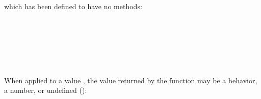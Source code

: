 \begin{AgdaAlign}
which has been defined to have no methods:
%
\begin{code}%
%
\>[6]\AgdaSpace{}%
\AgdaSymbol{:}\AgdaSpace{}%
\AgdaSpace{}%
\AgdaSpace{}%
\AgdaSpace{}%
\AgdaSpace{}%
\AgdaSpace{}%
\AgdaSpace{}%
\<%
\\
%
\>[6]\AgdaSpace{}%
\AgdaSymbol{(}\AgdaSpace{}%
\AgdaSpace{}%
\AgdaSymbol{)}\AgdaSpace{}%
\AgdaSpace{}%
\AgdaSymbol{=}\<%
\\
\>[6][@{}l@{\AgdaIndent{0}}]%
\>[8]\AgdaSpace{}%
\AgdaSpace{}%
\AgdaSpace{}%
%
\>[20]\AgdaOperator{\AgdaFunction{[}}%
\>[23]\AgdaSymbol{(}\AgdaSpace{}%
\AgdaSpace{}%
\AgdaSpace{}%
\AgdaSpace{}%
\AgdaSpace{}%
\AgdaSymbol{(}\AgdaSpace{}%
\AgdaSpace{}%
\AgdaSpace{}%
\AgdaSpace{}%
\AgdaSymbol{(}\AgdaSpace{}%
\AgdaSpace{}%
\AgdaSymbol{))}\AgdaSpace{}%
\AgdaSymbol{)}\AgdaSpace{}%
\AgdaOperator{\AgdaFunction{,}}\<%
\\
%
\>[23]\AgdaSymbol{(}\AgdaSpace{}%
\AgdaSpace{}%
\AgdaSymbol{(}\AgdaSpace{}%
\AgdaSpace{}%
\AgdaSymbol{)}\AgdaSpace{}%
\AgdaSpace{}%
\AgdaSymbol{)}\<%
\\
%
\>[20]\AgdaOperator{\AgdaFunction{]?}}\AgdaSpace{}%
\AgdaSymbol{(}\AgdaSpace{}%
\AgdaSymbol{(}\AgdaSpace{}%
\AgdaSpace{}%
\AgdaSymbol{)}\AgdaSpace{}%
\AgdaSymbol{)}\<%
\\
%
\>[6]\AgdaSpace{}%
\AgdaSpace{}%
\AgdaSpace{}%
\AgdaSymbol{=}\AgdaSpace{}%
\<%
\end{code}
%
When applied to a value , the value returned by the function  may be
a behavior, a number, or undefined ():

\end{AgdaAlign}
